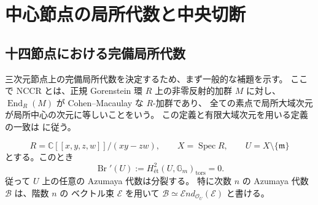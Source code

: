 \section{中心節点の局所代数と中央切断}
\label{mix:sec:local-orders}

\subsection{十四節点における完備局所代数}

三次元節点上の完備局所代数を決定するため、まず一般的な補題を示す。
ここで NCCR とは、正規 Gorenstein 環 $R$ 上の非零反射的加群 $M$ に対し、
$\operatorname{End}_R(M)$ が Cohen--Macaulay な $R$-加群であり、
全ての素点で局所大域次元が局所中心の次元に等しいことをいう。
この定義と有限大域次元を用いる定義の一致は
\cite[Definition~1.7 and Lemma~2.23]{CMOIyamaWemyssMM} に従う。

\begin{lemma}
\label{cmo:lem:formal-node-brauer}
\[
 R=\mathbb C[[x,y,z,w]]/(xy-zw),\qquad
 X=\operatorname{Spec}R,\qquad
 U=X\setminus\{\mathfrak m\}
\]
とする。このとき
\[
 \operatorname{Br}'(U):=
 H^2_{\text{ét}}(U,\mathbb G_m)_{\mathrm{tors}}=0.
\]
従って $U$ 上の任意の Azumaya 代数は分裂する。
特に次数 $n$ の Azumaya 代数 $\mathcal B$ は、階数 $n$ の
ベクトル束 $\mathcal E$ を用いて
$\mathcal B\simeq\mathcal E nd_{\mathcal O_U}(\mathcal E)$ と書ける。
\end{lemma}

